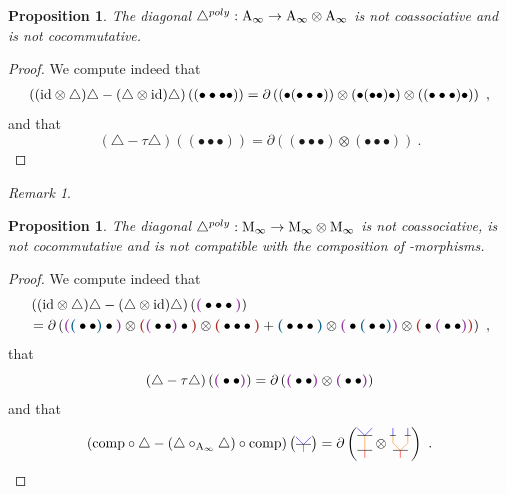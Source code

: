 \documentclass[twoside, 12pt]{amsart}
\newtheorem{proposition}[definition]{Proposition}
\theoremstyle{remark}
\newtheorem{remark}[definition]{\sc Remark}
\begin{document}
\begin{proposition} \label{prop:properties-diagonal-ainf}
  The diagonal $\triangle^{poly} : \mathrm{A}_\infty \rightarrow \mathrm{A}_\infty \otimes \mathrm{A}_\infty$ is not coassociative and is not cocommutative.
\end{proposition}

\begin{proof}
  We compute indeed that
  \begin{align*}
      \left( (\mathrm{id} \otimes \triangle ) \triangle - (\triangle \otimes \mathrm{id}) \triangle \right) \left( ( \bullet \bullet \bullet \bullet ) \right)  
      = \partial \left( ( \bullet ( \bullet \bullet \bullet ) ) \otimes (\bullet ( \bullet \bullet ) \bullet ) \otimes ( ( \bullet \bullet \bullet ) \bullet )  \right) \ ,
  \end{align*}
  and that \[ \left( \triangle - \tau \triangle \right) \left( ( \bullet \bullet \bullet ) \right) = \partial \left( ( \bullet \bullet \bullet ) \otimes ( \bullet \bullet \bullet ) \right) \ . \]
\end{proof}

\begin{remark}
\end{remark}

\begin{proposition} \label{prop:properties-diagonal-minf}
  The diagonal $\triangle^{poly} : \mathrm{M}_\infty \rightarrow \mathrm{M}_\infty \otimes \mathrm{M}_\infty$ is not coassociative, is not cocommutative and is not compatible with the composition of \Ainf -morphisms.
\end{proposition}

\begin{proof}
  We compute indeed that
  \begin{align*}
      &\left( (\ide \otimes \triangle ) \triangle - (\triangle \otimes \ide) \triangle \right) \left( \purple{\bullet \bullet \bullet} \right)  \\
      &= \partial \left(
  \purple{\blue{\bullet \bullet} \bullet} \otimes \red{\purple{\bullet \bullet} \bullet} \otimes \red{\bullet \bullet \bullet}
  + \blue{\bullet \bullet \bullet} \otimes \purple{ \bullet \blue{\bullet \bullet}} \otimes \red{\bullet \purple{\bullet \bullet}}
  \right) \ ,
  \end{align*} 
  that
  \[ \left( \triangle - \tau \triangle \right) \left( \purple{\bullet \bullet} \right) = \partial \left( \purple{\bullet \bullet} \otimes \purple{\bullet \bullet} \right) \]
  and that 
  \[ \left( \comp  \circ \triangle - (\triangle \circ_{\Ainf} \triangle ) \circ \comp \right) \left( \arbreopdeuxmorph  \right) = \partial \left( \arbreopcompun \otimes \arbreopcompdeux \right)  \ . \]
\end{proof}
\end{document}
